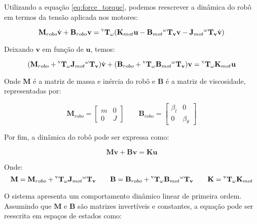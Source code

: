 Utilizando a equação \ref{eq:force_torque}, 
podemos reescrever a dinâmica do robô em 
termos da tensão aplicada nos motores:

\begin{equation}
\mathbf{M}_{robo} \dot{\mathbf{v}} + \mathbf{B}_{robo} \mathbf{v} = 
\mathbf{\prescript{\text{v}}{}{T_{\omega}}} (\mathbf{K}_{mot} \mathbf{u} - \mathbf{B}_{mot} \mathbf{\prescript{\omega}{}{T_v}} \mathbf{v} - \mathbf{J}_{mot} \mathbf{\prescript{\omega}{}{T_v}} \dot{\mathbf{v}})
\end{equation}

Deixando $\mathbf{v}$ em função de $\mathbf{u}$, temos:

\begin{equation}
(\mathbf{M}_{robo} + \mathbf{\prescript{\text{v}}{}{T_{\omega}}} \mathbf{J}_{mot} \mathbf{\prescript{\omega}{}{T_v}}) \dot{\mathbf{v}}
+
(\mathbf{B}_{robo} + \mathbf{\prescript{\text{v}}{}{T_{\omega}}} \mathbf{B}_{mot} \mathbf{\prescript{\omega}{}{T_v}}) \mathbf{v}
=
\mathbf{\prescript{\text{v}}{}{T_{\omega}}} \mathbf{K}_{mot} \mathbf{u}
\end{equation}

Onde $\mathbf{M}$ é a matriz de massa e inércia do robô e 
$\mathbf{B}$ é a matriz de viscosidade, representadas por:

\[
\mathbf{M}_{robo} =
\begin{bmatrix}
m & 0 \\
0 & J
\end{bmatrix}
\qquad
\mathbf{B}_{robo} =
\begin{bmatrix}
\beta_l & 0 \\
0 & \beta_{\theta}
\end{bmatrix}
\]

Por fim, a dinâmica do robô pode ser expressa como:

\begin{equation}
\mathbf{M} \dot{\mathbf{v}} + \mathbf{B} \mathbf{v} = \mathbf{K} \mathbf{u}
\label{eq:robot_dynamics}
\end{equation}

Onde:
\[
\mathbf{M} = \mathbf{M}_{robo} + \mathbf{\prescript{\text{v}}{}{T_{\omega}}} \mathbf{J}_{mot} \mathbf{\prescript{\omega}{}{T_v}}
\qquad
\mathbf{B} = \mathbf{B}_{robo} + \mathbf{\prescript{\text{v}}{}{T_{\omega}}} \mathbf{B}_{mot} \mathbf{\prescript{\omega}{}{T_v}}
\qquad
\mathbf{K} = \mathbf{\prescript{\text{v}}{}{T_{\omega}}} \mathbf{K}_{mot}
\]

O sistema apresenta um comportamento dinâmico linear de 
primeira ordem. Assumindo que $\mathbf{M}$ 
e $\mathbf{B}$ são matrizes invertíveis e constantes, 
a equação pode ser reescrita em espaços de estados como:

